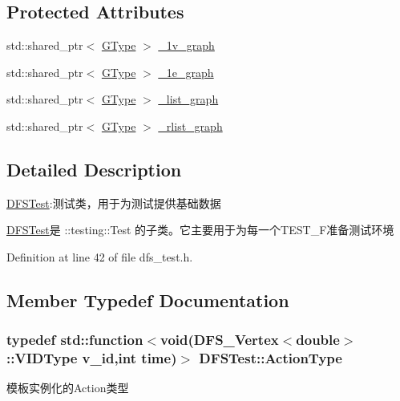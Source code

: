 \subsection*{Protected Attributes}
\begin{DoxyCompactItemize}
\item 
std\+::shared\+\_\+ptr$<$ \hyperlink{class_d_f_s_test_a32b63a9c79f6f7e7021daacf076a1512}{G\+Type} $>$ \hyperlink{class_d_f_s_test_a4dbae7784992bee522457b53da2141c2}{\+\_\+1v\+\_\+graph}
\item 
std\+::shared\+\_\+ptr$<$ \hyperlink{class_d_f_s_test_a32b63a9c79f6f7e7021daacf076a1512}{G\+Type} $>$ \hyperlink{class_d_f_s_test_ae5351e523345888ffc64aa892d93d3c2}{\+\_\+1e\+\_\+graph}
\item 
std\+::shared\+\_\+ptr$<$ \hyperlink{class_d_f_s_test_a32b63a9c79f6f7e7021daacf076a1512}{G\+Type} $>$ \hyperlink{class_d_f_s_test_a9607eac5350c4cdd449c353fed482efc}{\+\_\+list\+\_\+graph}
\item 
std\+::shared\+\_\+ptr$<$ \hyperlink{class_d_f_s_test_a32b63a9c79f6f7e7021daacf076a1512}{G\+Type} $>$ \hyperlink{class_d_f_s_test_a93a79d0654eb82517990c8f5419148a8}{\+\_\+rlist\+\_\+graph}
\end{DoxyCompactItemize}


\subsection{Detailed Description}
\hyperlink{class_d_f_s_test}{D\+F\+S\+Test}\+:测试类，用于为测试提供基础数据 

{\ttfamily \hyperlink{class_d_f_s_test}{D\+F\+S\+Test}}是 {\ttfamily \+::testing\+::\+Test} 的子类。它主要用于为每一个{\ttfamily T\+E\+S\+T\+\_\+\+F}准备测试环境 

Definition at line 42 of file dfs\+\_\+test.\+h.



\subsection{Member Typedef Documentation}
\hypertarget{class_d_f_s_test_ac4c131b9b4f9de55192b1c634dc1c37f}{}
\subsubsection[{Action\+Type}]{\setlength{\rightskip}{0pt plus 5cm}typedef std\+::function$<$void({\bf D\+F\+S\+\_\+\+Vertex}$<$double$>$\+::V\+I\+D\+Type v\+\_\+id,int time)$>$ {\bf D\+F\+S\+Test\+::\+Action\+Type}}\label{class_d_f_s_test_ac4c131b9b4f9de55192b1c634dc1c37f}
模板实例化的\+Action类型 

